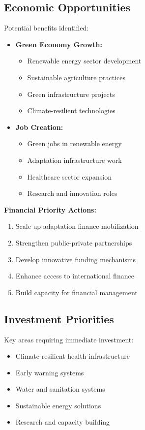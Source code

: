 \subsection{Economic Opportunities}
Potential benefits identified:

\begin{itemize}
    \item \textbf{Green Economy Growth:}
    \begin{itemize}
        \item Renewable energy sector development
        \item Sustainable agriculture practices
        \item Green infrastructure projects
        \item Climate-resilient technologies
    \end{itemize}
    
    \item \textbf{Job Creation:}
    \begin{itemize}
        \item Green jobs in renewable energy
        \item Adaptation infrastructure work
        \item Healthcare sector expansion
        \item Research and innovation roles
    \end{itemize}
\end{itemize}

\begin{recommendation}
\textbf{Financial Priority Actions:}
\begin{enumerate}
    \item Scale up adaptation finance mobilization
    \item Strengthen public-private partnerships
    \item Develop innovative funding mechanisms
    \item Enhance access to international finance
    \item Build capacity for financial management
\end{enumerate}
\end{recommendation}

\subsection{Investment Priorities}
Key areas requiring immediate investment:

\begin{itemize}
    \item Climate-resilient health infrastructure
    \item Early warning systems
    \item Water and sanitation systems
    \item Sustainable energy solutions
    \item Research and capacity building
\end{itemize}

